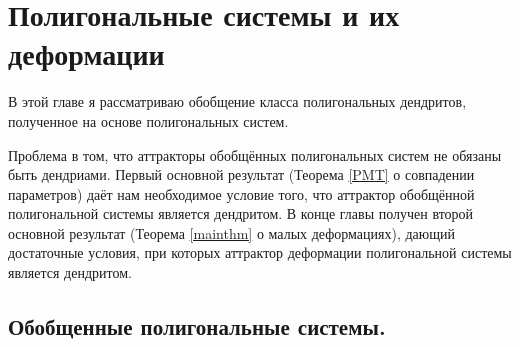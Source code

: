 \chapter{Полигональные системы и их деформации}

В этой главе я рассматриваю обобщение класса полигональных дендритов, полученное на основе полигональных систем.

Проблема в том, что аттракторы обобщённых полигональных систем не обязаны быть дендриами.
Первый основной результат (Теорема \ref{PMT} о совпадении параметров) даёт нам необходимое условие того, что аттрактор обобщённой полигональной системы является дендритом.
В конце главы получен второй основной результат (Теорема \ref{mainthm} о малых деформациях), дающий достаточные условия, при которых аттрактор деформации полигональной системы является дендритом.


\section{Обобщенные полигональные системы.} 

